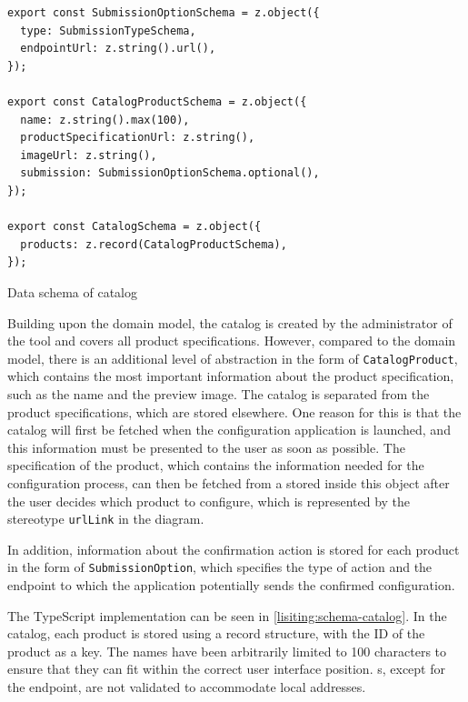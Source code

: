 \begin{listing}[h]
\begin{verbatim}
export const SubmissionOptionSchema = z.object({
  type: SubmissionTypeSchema,
  endpointUrl: z.string().url(),
});

export const CatalogProductSchema = z.object({
  name: z.string().max(100),
  productSpecificationUrl: z.string(),
  imageUrl: z.string(),
  submission: SubmissionOptionSchema.optional(),
});

export const CatalogSchema = z.object({
  products: z.record(CatalogProductSchema),
});
\end{verbatim}
\caption{Data schema of catalog}
\label{lisiting:schema-catalog}
\end{listing}

Building upon the domain model, the catalog is created by the administrator of the tool and covers all product specifications. However, compared to the domain model, there is an additional level of abstraction in the form of \texttt{CatalogProduct}, which contains the most important information about the product specification, such as the name and the preview image. The catalog is separated from the product specifications, which are stored elsewhere. One reason for this is that the catalog will first be fetched when the configuration application is launched, and this information must be presented to the user as soon as possible. The specification of the product, which contains the information needed for the configuration process, can then be fetched from a  stored inside this object after the user decides which product to configure, which is represented by the stereotype \texttt{urlLink} in the  diagram.

In addition, information about the confirmation action is stored for each product in the form of \texttt{SubmissionOption}, which specifies the type of action and the endpoint to which the application potentially sends the confirmed configuration.

The TypeScript implementation can be seen in \autoref{lisiting:schema-catalog}. In the catalog, each product is stored using a record structure, with the ID of the product as a key. The names have been arbitrarily limited to 100 characters to ensure that they can fit within the correct user interface position. s, except for the endpoint, are not validated to accommodate local addresses.


